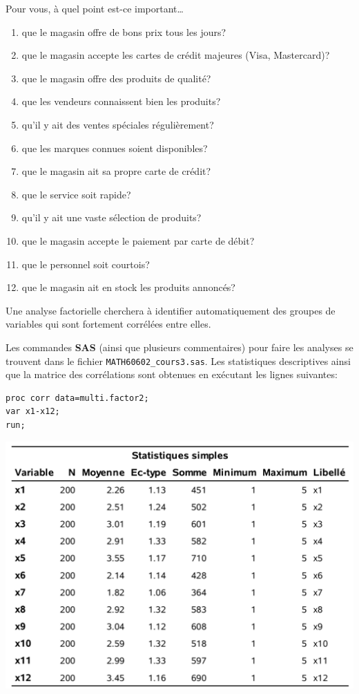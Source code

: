 \documentclass[
]{book}
\providecommand{\tightlist}{%
  \setlength{\itemsep}{0pt}\setlength{\parskip}{0pt}}
\theoremstyle{definition}
\theoremstyle{definition}
\theoremstyle{definition}
\theoremstyle{remark}
\begin{document}
Pour vous, à quel point est-ce important\ldots

\begin{enumerate}
\def\labelenumi{\arabic{enumi}.}
\tightlist
\item
  que le magasin offre de bons prix tous les jours?
\item
  que le magasin accepte les cartes de crédit majeures (Visa, Mastercard)?
\item
  que le magasin offre des produits de qualité?
\item
  que les vendeurs connaissent bien les produits?
\item
  qu'il y ait des ventes spéciales régulièrement?
\item
  que les marques connues soient disponibles?
\item
  que le magasin ait sa propre carte de crédit?
\item
  que le service soit rapide?
\item
  qu'il y ait une vaste sélection de produits?
\item
  que le magasin accepte le paiement par carte de débit?
\item
  que le personnel soit courtois?
\item
  que le magasin ait en stock les produits annoncés?
\end{enumerate}

Une analyse factorielle cherchera à identifier automatiquement des groupes de variables qui sont fortement corrélées entre elles.

Les commandes \textbf{SAS} (ainsi que plusieurs commentaires) pour faire les analyses se trouvent dans le fichier \texttt{MATH60602\_cours3.sas}. Les statistiques descriptives ainsi que la matrice des corrélations sont obtenues en exécutant les lignes suivantes:

\begin{verbatim}
proc corr data=multi.factor2;
var x1-x12;
run;
\end{verbatim}

\begin{center}\includegraphics[width=0.9\linewidth]{figures/01-facto-e1} \end{center}
\end{document}

